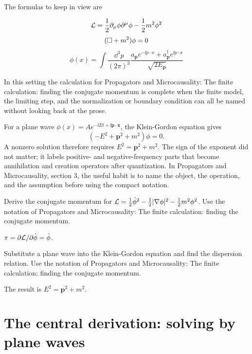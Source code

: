 The formulas to keep in view are

\[
  \mathcal L=\frac12\partial_\mu\phi\partial^\mu\phi-\frac12m^2\phi^2
\]
\[
  (\Box+m^2)\phi=0
\]
\[
  \phi(x)=\int\frac{\dd^3p}{(2\pi)^3}\frac{a_{\bm p}e^{-\ii p\cdot x}+a_{\bm p}^\dagger e^{\ii p\cdot x}}{\sqrt{2E_{\bm p}}}
\]

In this setting the calculation for Propagators and Microcausality: The finite calculation: finding the conjugate momentum is complete when the finite model, the limiting step, and the normalization or boundary condition can all be named without looking back at the prose.




\begin{example}
For a plane wave \(\phi(x)=Ae^{-\ii Et+\ii\bm p\cdot\bm x}\), the Klein-Gordon equation gives
\[
  (-E^2+\bm p^2+m^2)\phi=0.
\]
A nonzero solution therefore requires \(E^2=\bm p^2+m^2\).  The sign of the exponent did not matter; it labels positive- and negative-frequency parts that become annihilation and creation operators after quantization.  In Propagators and Microcausality, section 3, the useful habit is to name the object, the operation, and the assumption before using the compact notation.
\end{example}



\begin{exercise}
Derive the conjugate momentum for \(\mathcal L=\frac12\dot\phi^2-\frac12|\nabla\phi|^2-\frac12m^2\phi^2\).  Use the notation of Propagators and Microcausality: The finite calculation: finding the conjugate momentum.
\begin{answer}
\(\pi=\partial\mathcal L/\partial\dot\phi=\dot\phi\).
\end{answer}
\end{exercise}

\begin{exercise}
Substitute a plane wave into the Klein-Gordon equation and find the dispersion relation.  Use the notation of Propagators and Microcausality: The finite calculation: finding the conjugate momentum.
\begin{answer}
The result is \(E^2=\bm p^2+m^2\).
\end{answer}
\end{exercise}



\section{The central derivation: solving by plane waves}

